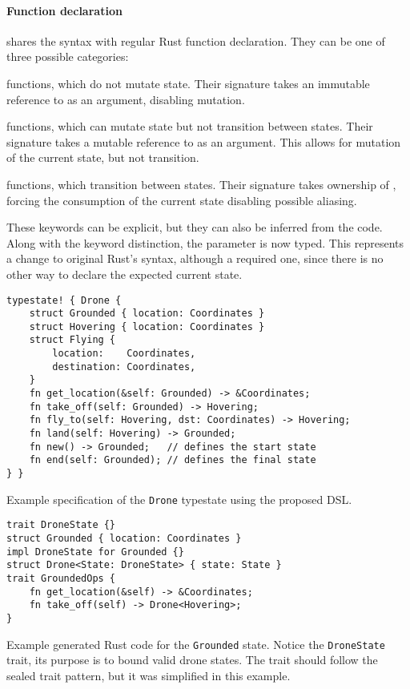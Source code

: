 \paragraph{Function declaration} shares the syntax with regular Rust function declaration.
They can be one of three possible categories:
\begin{compactitem}
    \item {} functions, which do not mutate state.
    Their signature takes an immutable reference to  as an argument,
    disabling mutation.
    \item {} functions, which can mutate state but not transition between states.
    Their signature takes a mutable reference to  as an argument.
    This allows for mutation of the current state, but not transition.
    \item {} functions, which transition between states.
    Their signature takes ownership of ,
    forcing the consumption of the current state disabling possible aliasing.
\end{compactitem}
These keywords can be explicit, but they can also be inferred from the code.
Along with the keyword distinction, the  parameter is now typed.
This represents a change to original Rust's syntax, although a required one,
since there is no other way to declare the expected current state.

\begin{listing}
    \centering
    \begin{verbatim}
typestate! { Drone {
    struct Grounded { location: Coordinates }
    struct Hovering { location: Coordinates }
    struct Flying {
        location:    Coordinates,
        destination: Coordinates,
    }
    fn get_location(&self: Grounded) -> &Coordinates;
    fn take_off(self: Grounded) -> Hovering;
    fn fly_to(self: Hovering, dst: Coordinates) -> Hovering;
    fn land(self: Hovering) -> Grounded;
    fn new() -> Grounded;   // defines the start state
    fn end(self: Grounded); // defines the final state
} }
    \end{verbatim}
    \caption{
        Example specification of the \texttt{Drone} typestate using the proposed DSL.
    }
    \label{lst:dsl-typestate-spec}
\end{listing}


\begin{listing}
    \centering
    \begin{verbatim}
trait DroneState {}
struct Grounded { location: Coordinates }
impl DroneState for Grounded {}
struct Drone<State: DroneState> { state: State }
trait GroundedOps {
    fn get_location(&self) -> &Coordinates;
    fn take_off(self) -> Drone<Hovering>;
}
    \end{verbatim}
    \caption{
        Example generated Rust code for the \texttt{Grounded} state.
        Notice the \texttt{DroneState} trait, its purpose is to bound valid drone states.
        The trait should follow the sealed trait pattern, but it was simplified in this example.
    }
    \label{lst:dsl-typestate-generated}
\end{listing}


